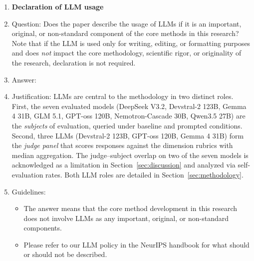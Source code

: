 \begin{enumerate}
\item {\bf Declaration of LLM usage}
    \item[] Question: Does the paper describe the usage of LLMs if it is an important, original, or non-standard component of the core methods in this research? Note that if the LLM is used only for writing, editing, or formatting purposes and does \emph{not} impact the core methodology, scientific rigor, or originality of the research, declaration is not required.
    \item[] Answer: \answerYes{}
    \item[] Justification: LLMs are central to the methodology in two distinct roles. First, the seven evaluated models (DeepSeek V3.2, Devstral-2 123B, Gemma 4 31B, GLM 5.1, GPT-oss 120B, Nemotron-Cascade 30B, Qwen3.5 27B) are the \emph{subjects} of evaluation, queried under baseline and prompted conditions. Second, three LLMs (Devstral-2 123B, GPT-oss 120B, Gemma 4 31B) form the \emph{judge panel} that scores responses against the dimension rubrics with median aggregation. The judge--subject overlap on two of the seven models is acknowledged as a limitation in Section~\ref{sec:discussion} and analyzed via self-evaluation rates. Both LLM roles are detailed in Section~\ref{sec:methodology}.
    \item[] Guidelines:
    \begin{itemize}
        \item The answer \answerNA{} means that the core method development in this research does not involve LLMs as any important, original, or non-standard components.
        \item Please refer to our LLM policy in the NeurIPS handbook for what should or should not be described.
    \end{itemize}

\end{enumerate}
